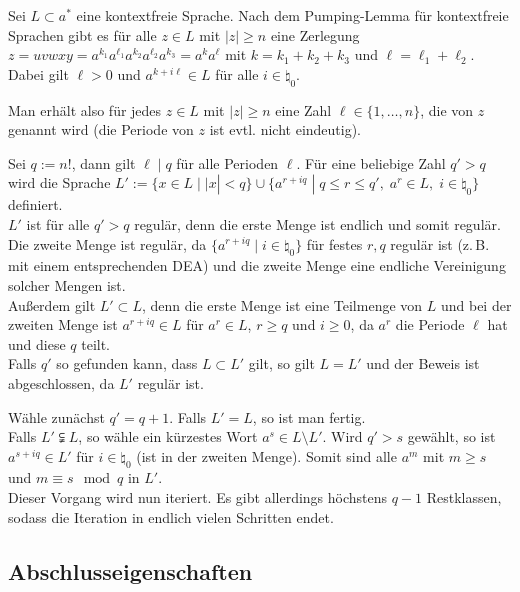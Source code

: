 \begin{Beweis}
    Sei $L \subset a^\ast$ eine kontextfreie Sprache.
    Nach dem Pumping-Lemma für kontextfreie Sprachen gibt es für alle
    $z \in L$ mit $|z| \ge n$ eine Zerlegung $z = uvwxy =
    a^{k_1} a^{\ell_1} a^{k_2} a^{\ell_2} a^{k_3} = a^k a^\ell$ mit
    $k = k_1 + k_2 + k_3$ und $\ell = \ell_1 + \ell_2$.
    Dabei gilt $\ell > 0$ und $a^{k + i\ell} \in L$ für alle
    $i \in \natural_0$.
    
    Man erhält also für jedes $z \in L$ mit $|z| \ge n$ eine Zahl
    $\ell \in \{1, \dotsc, n\}$, die  von $z$ genannt wird
    (die Periode von $z$ ist evtl. nicht eindeutig).
    
    Sei $q := n!$, dann gilt $\ell \;|\; q$ für alle Perioden $\ell$.
    Für eine beliebige Zahl $q' > q$ wird die Sprache
    $L' := \{x \in L \;|\; |x| < q\} \cup \{a^{r + iq} \;|\;
    q \le r \le q',\; a^r \in L,\; i \in \natural_0\}$ definiert.\\
    $L'$ ist für alle $q' > q$ regulär, denn
    die erste Menge ist endlich und somit regulär.
    Die zweite Menge ist regulär, da $\{a^{r + iq} \;|\; i \in \natural_0\}$
    für festes $r, q$ regulär ist (z.\,B. mit einem entsprechenden DEA)
    und die zweite Menge eine endliche Vereinigung solcher Mengen ist.\\
    Außerdem gilt $L' \subset L$, denn die erste Menge ist eine Teilmenge von
    $L$ und bei der zweiten Menge ist $a^{r + iq} \in L$ für $a^r \in L$,
    $r \ge q$ und $i \ge 0$, da $a^r$ die Periode $\ell$ hat und diese $q$
    teilt.\\
    Falls $q'$ so gefunden kann, dass $L \subset L'$ gilt, so gilt
    $L = L'$ und der Beweis ist abgeschlossen, da $L'$ regulär ist.
    
    Wähle zunächst $q' = q + 1$.
    Falls $L' = L$, so ist man fertig.\\
    Falls $L' \subsetneqq L$, so wähle ein kürzestes Wort
    $a^s \in L \setminus L'$.
    Wird $q' > s$ gewählt, so ist $a^{s + iq} \in L'$ für $i \in \natural_0$
    (ist in der zweiten Menge).
    Somit sind alle $a^m$ mit $m \ge s$ und $m \equiv s \mod q$ in $L'$.\\
    Dieser Vorgang wird nun iteriert.
    Es gibt allerdings höchstens $q - 1$ Restklassen, sodass die Iteration in
    endlich vielen Schritten endet.
\end{Beweis}

\pagebreak

\subsection{%
    Abschlusseigenschaften%
}

